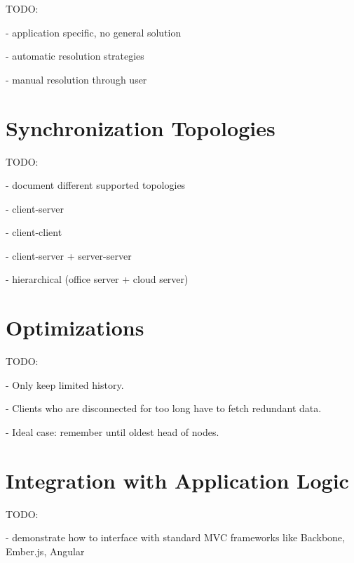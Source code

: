 TODO:

- application specific, no general solution

- automatic resolution strategies

- manual resolution through user

\section{Synchronization Topologies}

TODO:

- document different supported topologies

- client-server

- client-client

- client-server + server-server

- hierarchical (office server + cloud server)

\section{Optimizations}

TODO:

- Only keep limited history.

- Clients who are disconnected for too long have to fetch redundant data.

- Ideal case: remember until oldest head of nodes.

\section{Integration with Application Logic}

TODO:

- demonstrate how to interface with standard MVC frameworks like Backbone, Ember.js, Angular
